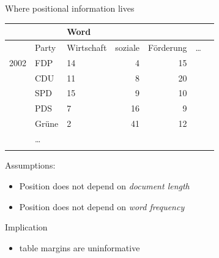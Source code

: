 \documentclass{hertieteaching}
\begin{document}
\begin{frame}{Where positional information lives}

\begin{center}{\scriptsize
\begin{tabular}{lllrrrr}\toprule
      &            &        Word \\ \midrule
      &     Party  &  Wirtschaft & soziale & Förderung & \ldots \\ \midrule
2002  &     FDP       &       14 &       4 &        15 & \\
      &     CDU       &       11 &       8 &        20 & \\
      &     SPD       &       15 &       9 &        10 & \\
      &     PDS       &        7 &      16 &         9 & \\
      &     Grüne     &        2 &      41 &        12 & \\
      &     \ldots \\ \bottomrule
\label{fragment}
\end{tabular}}\end{center}

Assumptions:
\begin{itemize}
  \item Position does not depend on \textit{document length}
  \item Position does not depend on \textit{word frequency}
\end{itemize}

\pause 

Implication
\begin{itemize}
  \item table margins are uninformative
\end{itemize}


\end{frame}
\end{document}
